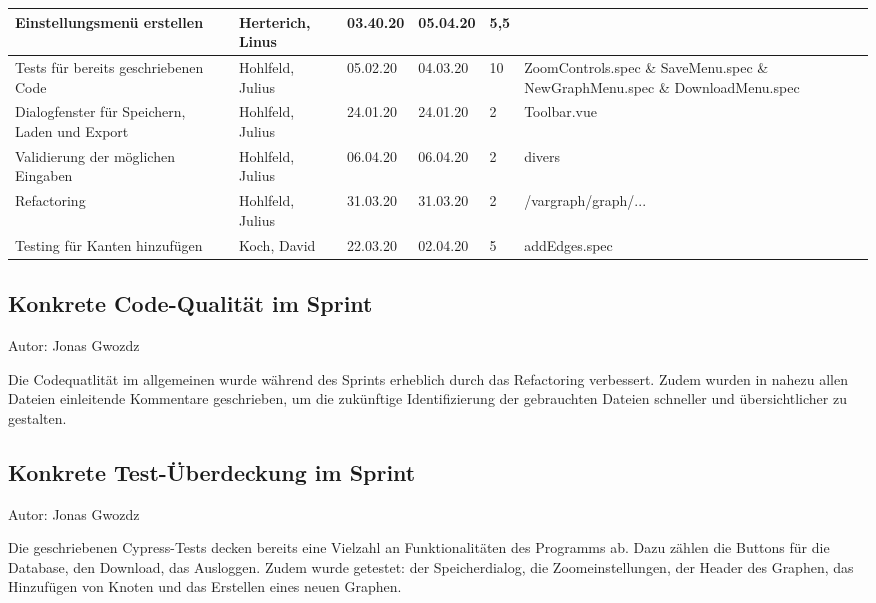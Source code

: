 \begin{longtable}{|p{4cm}|p{2cm}|p{1.2cm}|p{1.2cm}|p{0.7cm}|p{3.8cm}|}
  Einstellungsmenü erstellen                                            & Herterich, Linus      & 03.40.20 & 05.04.20 & 5,5   &              \\ \hline
  Tests für bereits geschriebenen Code                                  & Hohlfeld, Julius      & 05.02.20 & 04.03.20 & 10    & ZoomControls.spec \& SaveMenu.spec \& NewGraphMenu.spec \& DownloadMenu.spec \\ \hline
  Dialogfenster für Speichern, Laden und Export                         & Hohlfeld, Julius      & 24.01.20 & 24.01.20 & 2     & Toolbar.vue \\ \hline
  Validierung der möglichen Eingaben                                    & Hohlfeld, Julius      & 06.04.20 & 06.04.20 & 2     & divers                             \\ \hline
  Refactoring                                                           & Hohlfeld, Julius      & 31.03.20 & 31.03.20 & 2     & /vargraph/graph/...                     \\ \hline
  Testing für Kanten hinzufügen                                         & Koch, David           & 22.03.20 & 02.04.20 & 5     & addEdges.spec      \\ \hline
\end{longtable}

\subsection{Konkrete Code-Qualität im Sprint}
{\small Autor: Jonas Gwozdz}

Die Codequatlität im allgemeinen wurde während des Sprints erheblich durch das Refactoring verbessert. Zudem wurden in nahezu  allen Dateien einleitende Kommentare geschrieben, um die zukünftige Identifizierung der gebrauchten Dateien schneller und übersichtlicher zu gestalten.

\subsection{Konkrete Test-Überdeckung im Sprint}
{\small Autor: Jonas Gwozdz}

Die geschriebenen Cypress-Tests decken bereits eine Vielzahl an Funktionalitäten des Programms ab. Dazu zählen die Buttons für die Database, den Download, das Ausloggen. Zudem wurde getestet: der Speicherdialog, die Zoomeinstellungen, der Header des Graphen, das Hinzufügen von Knoten und das Erstellen eines neuen Graphen.

